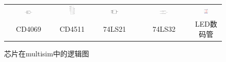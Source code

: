 \documentclass[12pt]{article}
\begin{document}
\begin{figure}[h]
\begin{tabular}{ccccc}
\includegraphics[width=0.18\textwidth]{TIM20180923151008.png}&\includegraphics[width=0.18\textwidth]{TIM20180923151644.png}&\includegraphics[width=0.18\textwidth]{TIM20180923151902.png}&\includegraphics[width=0.18\textwidth]{TIM20180923152133.png}&\includegraphics[width=0.18\textwidth]{TIM20180923152329.png}\\
CD4069&CD4511&74LS21&74LS32&LED数码管\\
  \end{tabular}
\caption{芯片在multisim中的逻辑图}
  \label{fig:luoji}
\end{figure}
\end{document}
